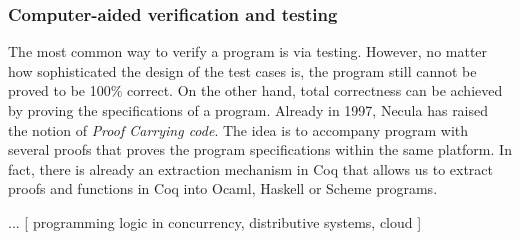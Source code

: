 \subsubsection{Computer-aided verification and testing}
\par The most common way to verify a program is via testing. However,
no matter how sophisticated the design of the test cases is, the
program still cannot be proved to be 100\% correct. On the other
hand, total correctness can be achieved by proving the specifications
of a program. Already in 1997, Necula \cite{necula1997} has raised the
notion of \textit{Proof Carrying code}. The idea is to accompany
program with several proofs that proves the program specifications
within the same platform. In fact, there is already an
extraction mechanism \cite{letouzey2008} in Coq that allows us to
extract proofs and functions in Coq into Ocaml, Haskell or Scheme
programs. 

\par ... [ programming logic in concurrency, distributive systems,
cloud ] 